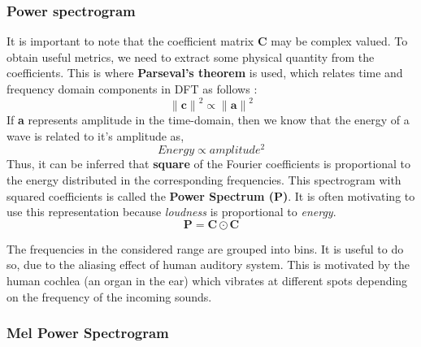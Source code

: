 \subsubsection{Power spectrogram}
\noindent It is important to note that the coefficient matrix $\textbf{C}$ may be complex valued. To obtain useful metrics, we need to extract some physical quantity from the coefficients. This is where \textbf{Parseval's theorem} is used, which relates time and frequency domain components in DFT as follows \cite{allen} :
\begin{equation}
{\|\textbf{c}\|}^2 \propto {\|\textbf{a}\|}^2
\end{equation}
If \textbf{a} represents amplitude in the time-domain, then we know that the energy of a wave is related to it's amplitude as,
\begin{equation}
Energy \propto amplitude^2
\end{equation}
Thus, it can be inferred that \textbf{square} of the Fourier coefficients is proportional to the energy distributed in the corresponding frequencies. This spectrogram with squared coefficients is called the \textbf{Power Spectrum (P)}. It is often motivating to use this representation because \textit{loudness} is proportional to \textit{energy}.
\begin{equation}
\label{energy}
\textbf{P} = \textbf{C} \odot \textbf{C}
\end{equation}

\noindent The frequencies in the considered range are  grouped into bins. It is useful to do so, due to the aliasing effect of human auditory system. This is motivated by the human cochlea (an organ in the ear) which vibrates at different spots depending on the frequency of the incoming sounds.
  
\subsubsection{Mel Power Spectrogram}
\label{mel}


